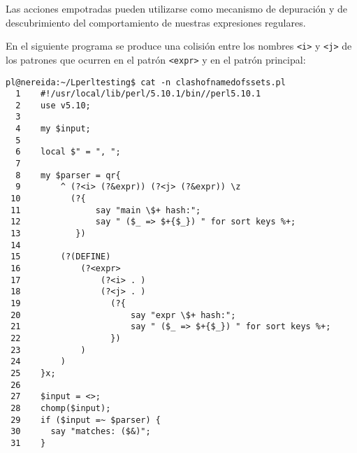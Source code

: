
Las acciones empotradas pueden utilizarse como mecanismo de 
depuración y de descubrimiento del comportamiento de nuestras expresiones 
regulares.

En el siguiente programa se produce una colisión
entre los nombres \verb|<i>| y \verb|<j>| de los patrones 
que ocurren en el patrón \verb|<expr>|
y en el patrón principal:

\begin{latexonly}
\begin{verbatim}
pl@nereida:~/Lperltesting$ cat -n clashofnamedofssets.pl
  1    #!/usr/local/lib/perl/5.10.1/bin//perl5.10.1
  2    use v5.10;
  3  
  4    my $input;
  5  
  6    local $" = ", ";
  7  
  8    my $parser = qr{
  9        ^ (?<i> (?&expr)) (?<j> (?&expr)) \z
 10          (?{
 11               say "main \$+ hash:";
 12               say " ($_ => $+{$_}) " for sort keys %+;
 13           })
 14  
 15        (?(DEFINE)
 16            (?<expr>
 17                (?<i> . )
 18                (?<j> . )
 19                  (?{
 20                      say "expr \$+ hash:";
 21                      say " ($_ => $+{$_}) " for sort keys %+;
 22                  })
 23            )
 24        )
 25    }x;
 26  
 27    $input = <>;
 28    chomp($input);
 29    if ($input =~ $parser) {
 30      say "matches: ($&)";
 31    }
\end{verbatim}
\end{latexonly}
